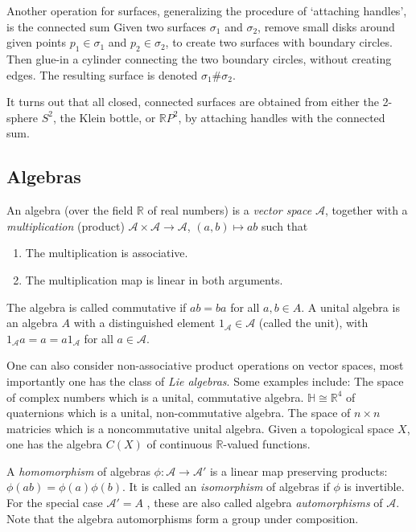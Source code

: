\documentclass{article}
\theoremstyle{definition}
\begin{document}
Another operation for surfaces, generalizing the procedure of ‘attaching handles’, is the connected sum Given two surfaces $\sigma_1$ and $\sigma_2$, remove small disks around given points $p_1 \in \sigma_1$ and $p_2 \in \sigma_2$, to create two surfaces with boundary circles. Then glue-in a cylinder connecting the two boundary circles, without creating edges. The resulting surface is denoted $\sigma_1\#\sigma_2$.

It turns out that all closed, connected surfaces are obtained from either the 2-sphere $S^2$, the Klein bottle, or  $\mathbb{R} P^2$, by attaching handles with the connected sum.


\subsection{Algebras}

An algebra (over the field $\mathbb R$ of real numbers) is a \textit{vector space} $\mathscr{A}$, together with a \textit{multiplication} (product) $\mathscr{A} \times \mathscr{A} \rightarrow \mathscr{A}$, $(a,b) \mapsto ab$ such that

\begin{enumerate}
    \item The multiplication is associative.
    \item  The multiplication map is linear in both arguments.
\end{enumerate}
The algebra is called commutative if $ab = ba$ for all $a,b \in A$. A unital algebra is an algebra $A$ with a distinguished element $1_{\mathscr{A}} \in \mathscr{A}$ (called the unit), with $1_{\mathscr{A}} a = a = a1_{\mathscr{A}}$ for all $a \in \mathscr{A}$.

One can also consider non-associative product operations on vector spaces, most importantly one has the class of \textit{Lie algebras}. Some examples include: The space of complex numbers which is a unital, commutative algebra. $\mathbb H \cong \mathbb R^4$ of quaternions which is a unital, non-commutative algebra. The space of $n\times n$ matricies which is a noncommutative unital algebra. Given a topological space $X$, one has the algebra $C(X)$ of continuous $\mathbb R$-valued functions.

A \textit{homomorphism} of algebras $\phi : \mathscr{A} \rightarrow \mathscr{A}'$ is a linear map preserving products: $\phi(ab) = \phi(a)\phi(b)$. It is called an \textit{isomorphism} of algebras if $\phi$ is invertible. For the special case $\mathscr{A}' = A$ , these are also called algebra \textit{automorphisms} of $\mathscr{A}$. Note that the algebra automorphisms form a group under composition.
\end{document}
